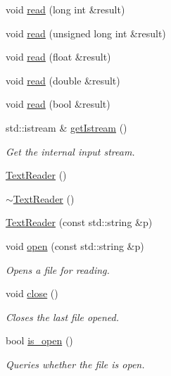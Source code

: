 \begin{DoxyCompactItemize}
\item 
void \mbox{\hyperlink{classENSEM_1_1TextReader_a6175ad804f9b13604f1cc7466a95725a}{read}} (long int \&result)
\item 
void \mbox{\hyperlink{classENSEM_1_1TextReader_a88188c5da2fe2882d38e7f8fa70b6e29}{read}} (unsigned long int \&result)
\item 
void \mbox{\hyperlink{classENSEM_1_1TextReader_a67d7171b0abb40a3c33c7cc92452d78f}{read}} (float \&result)
\item 
void \mbox{\hyperlink{classENSEM_1_1TextReader_ac12d688ee2475e365919e16183b0c816}{read}} (double \&result)
\item 
void \mbox{\hyperlink{classENSEM_1_1TextReader_a0aa4b524a014a6c53980d4717b48b733}{read}} (bool \&result)
\item 
std\+::istream \& \mbox{\hyperlink{classENSEM_1_1TextReader_a855b7272df1bd50c18f730f3ac882428}{get\+Istream}} ()
\begin{DoxyCompactList}\small\item\em Get the internal input stream. \end{DoxyCompactList}\item 
\mbox{\hyperlink{classENSEM_1_1TextReader_a139e8717032f310089148dd58b30d1d2}{Text\+Reader}} ()
\item 
\mbox{\hyperlink{classENSEM_1_1TextReader_a95ed1b116302f6fc2532451bd5df2dbd}{$\sim$\+Text\+Reader}} ()
\item 
\mbox{\hyperlink{classENSEM_1_1TextReader_a1c253bcaf58b6f01f25bb10b798f771e}{Text\+Reader}} (const std\+::string \&p)
\item 
void \mbox{\hyperlink{classENSEM_1_1TextReader_a167e412dc7a3a56fae35ccb4cc9d9029}{open}} (const std\+::string \&p)
\begin{DoxyCompactList}\small\item\em Opens a file for reading. \end{DoxyCompactList}\item 
void \mbox{\hyperlink{classENSEM_1_1TextReader_a19f171518a1c7a06739d2d7de016f346}{close}} ()
\begin{DoxyCompactList}\small\item\em Closes the last file opened. \end{DoxyCompactList}\item 
bool \mbox{\hyperlink{classENSEM_1_1TextReader_a67e8ac68ff413c1101522eedafc2d994}{is\+\_\+open}} ()
\begin{DoxyCompactList}\small\item\em Queries whether the file is open. \end{DoxyCompactList}\item 

\end{DoxyCompactItemize}
